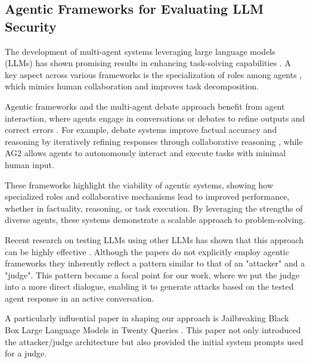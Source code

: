 \subsection{Agentic Frameworks for Evaluating LLM Security}

The development of multi-agent systems leveraging large language models (LLMs) has shown promising results in enhancing task-solving capabilities \cite{Hong2023MetaGPTMP, Wang2023UnleashingTE, Talebirad2023MultiAgentCH, Wu2023AutoGenEN, Du2023ImprovingFA}. A key aspect across various frameworks is the specialization of roles among agents \cite{Hong2023MetaGPTMP, Wu2023AutoGenEN}, which mimics human collaboration and improves task decomposition.

Agentic frameworks and the multi-agent debate approach benefit from agent interaction, where agents engage in conversations or debates to refine outputs and correct errors \cite{Wu2023AutoGenEN}. For example, debate systems improve factual accuracy and reasoning by iteratively refining responses through collaborative reasoning \cite{Du2023ImprovingFA}, while AG2 allows agents to autonomously interact and execute tasks with minimal human input.

These frameworks highlight the viability of agentic systems, showing how specialized roles and collaborative mechanisms lead to improved performance, whether in factuality, reasoning, or task execution. By leveraging the strengths of diverse agents, these systems demonstrate a scalable approach to problem-solving.

Recent research on testing LLMs using other LLMs has shown that this approach can be highly effective \cite{chao2024jailbreakingblackboxlarge, Yu2023GPTFUZZERRT, Perez2022RedTL}. Although the papers do not explicitly employ agentic frameworks they inherently reflect a pattern similar to that of an "attacker" and a "judge". \cite{chao2024jailbreakingblackboxlarge}  This pattern became a focal point for our work, where we put the judge into a more direct dialogue, enabling it to generate attacks based on the tested agent response in an active conversation.

A particularly influential paper in shaping our approach is Jailbreaking Black Box Large Language Models in Twenty Queries \cite{chao2024jailbreakingblackboxlarge}. This paper not only introduced the attacker/judge architecture but also provided the initial system prompts used for a judge.